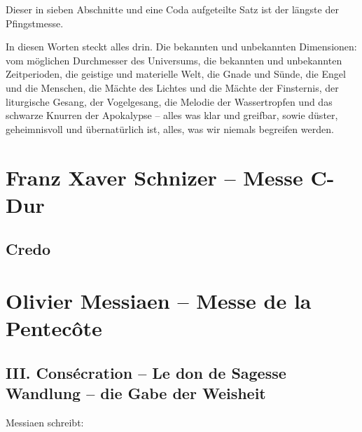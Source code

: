 \documentclass[a5paper,twoside,fontsize=11pt]{scrartcl}
\newcommand{\frenchandgermantitle}[2]{\subsection*{#1 \\#2}}
\begin{document}
Dieser in sieben Abschnitte und eine Coda aufgeteilte Satz ist der längste der Pfingstmesse.

In diesen Worten steckt alles drin.
Die bekannten und unbekannten Dimensionen: vom möglichen Durchmesser des Universums, die bekannten und unbekannten Zeitperioden, die geistige und materielle Welt, die Gnade und Sünde, die Engel und die Menschen, die Mächte des Lichtes und die Mächte der Finsternis, der liturgische Gesang, der Vogelgesang, die Melodie der Wassertropfen und das schwarze Knurren der Apokalypse – alles was klar und greifbar, sowie düster, geheimnisvoll und übernatürlich ist, alles, was wir niemals begreifen werden.

\section*{Franz Xaver Schnizer – Messe C-Dur}
\subsection*{Credo}
\begin{Parallel}{0.45\textwidth}{0.5\textwidth}
    \RaggedRight
    
\end{Parallel}
\vspace{\baselineskip}

\section*{Olivier Messiaen – Messe de la Pentecôte}

\frenchandgermantitle{III. Consécration – Le don de Sagesse}{Wandlung – die Gabe der Weisheit}

\medskip

\noindent Messiaen schreibt:
\end{document}
